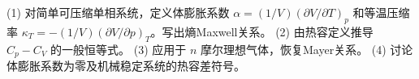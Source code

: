 (1) 对简单可压缩单相系统，定义体膨胀系数 \(\alpha=(1/V)(\partial V/\partial T)_p\) 和等温压缩率 \(\kappa_T=-(1/V)(\partial V/\partial p)_T\)。写出熵Maxwell关系。
(2) 由热容定义推导 \(C_p-C_V\) 的一般恒等式。
(3) 应用于 \(n\) 摩尔理想气体，恢复Mayer关系。
(4) 讨论体膨胀系数为零及机械稳定系统的热容差符号。
